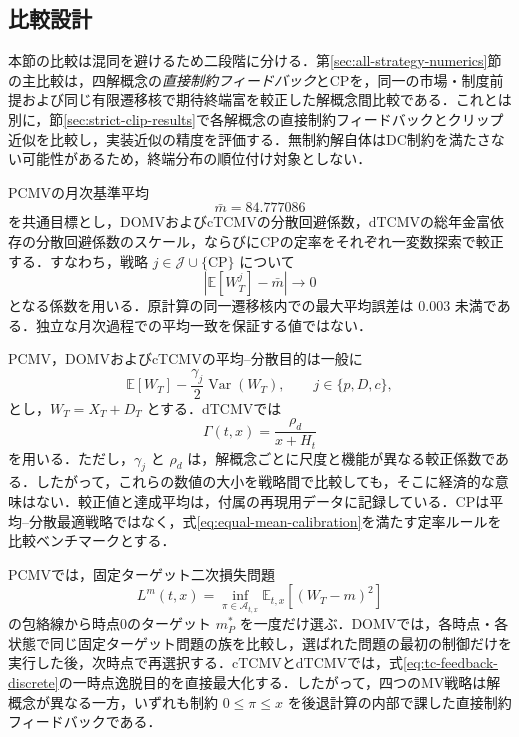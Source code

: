 \documentclass[10pt,a4paper]{article}
\theoremstyle{plain}
\theoremstyle{definition}
\newcommand{\E}{\mathbb{E}}
\DeclareMathOperator{\Var}{Var}
\begin{document}
\subsection{比較設計}

本節の比較は混同を避けるため二段階に分ける．第\ref{sec:all-strategy-numerics}節の主比較は，四解概念の\emph{直接制約フィードバック}とCPを，同一の市場・制度前提および同じ有限遷移核で期待終端富を較正した解概念間比較である．これとは別に，節\ref{sec:strict-clip-results}で各解概念の直接制約フィードバックとクリップ近似を比較し，実装近似の精度を評価する．無制約解自体はDC制約を満たさない可能性があるため，終端分布の順位付け対象としない．

PCMVの月次基準平均
\[
  \bar m=84.777086
\]
を共通目標とし，DOMVおよびcTCMVの分散回避係数，dTCMVの総年金富依存の分散回避係数のスケール，ならびにCPの定率をそれぞれ一変数探索で較正する．すなわち，戦略 $j\in\mathcal J\cup\{\mathrm{CP}\}$ について
\begin{equation}
  \left|\E[W_T^{j}]-\bar m\right|\longrightarrow 0
  \label{eq:equal-mean-calibration}
\end{equation}
となる係数を用いる．原計算の同一遷移核内での最大平均誤差は $0.003$ 未満である．独立な月次過程での平均一致を保証する値ではない．

PCMV，DOMVおよびcTCMVの平均--分散目的は一般に
\begin{equation}
  \E[W_T]-\frac{\gamma_j}{2}\Var(W_T),
  \qquad j\in\{p,D,c\},
  \label{eq:common-mv-gamma}
\end{equation}
とし，$W_T=X_T+D_T$ とする．dTCMVでは
\begin{equation}
  \Gamma(t,x)=\frac{\rho_d}{x+H_t}
\end{equation}
を用いる．ただし，$\gamma_j$ と $\rho_d$ は，解概念ごとに尺度と機能が異なる較正係数である．したがって，これらの数値の大小を戦略間で比較しても，そこに経済的な意味はない．較正値と達成平均は，付属の再現用データに記録している．CPは平均--分散最適戦略ではなく，式\eqref{eq:equal-mean-calibration}を満たす定率ルールを比較ベンチマークとする．

PCMVでは，固定ターゲット二次損失問題
\begin{equation}
  L^m(t,x)=\inf_{\pi\in\mathcal A_{t,x}}\E_{t,x}[(W_T-m)^2]
\end{equation}
の包絡線から時点0のターゲット $m_P^*$ を一度だけ選ぶ．DOMVでは，各時点・各状態で同じ固定ターゲット問題の族を比較し，選ばれた問題の最初の制御だけを実行した後，次時点で再選択する．cTCMVとdTCMVでは，式\eqref{eq:tc-feedback-discrete}の一時点逸脱目的を直接最大化する．したがって，四つのMV戦略は解概念が異なる一方，いずれも制約 $0\leq\pi\leq x$ を後退計算の内部で課した直接制約フィードバックである．
\end{document}
